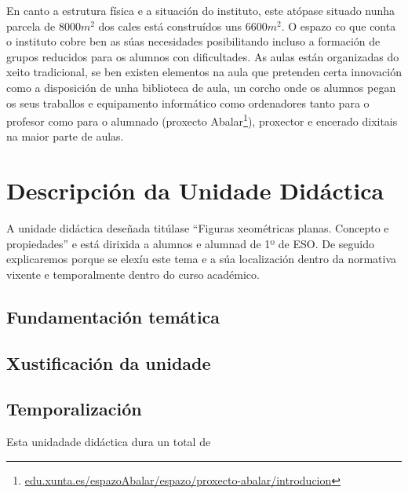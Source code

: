 En canto a estrutura física e a situación do instituto, este atópase situado nunha parcela de $8000 m^2$ dos cales está construídos uns $6600 m^2$. O espazo co que conta o instituto cobre ben as súas necesidades posibilitando incluso a formación de grupos reducidos para os alumnos con dificultades. As aulas están organizadas do xeito tradicional, se ben existen elementos na aula que pretenden certa innovación como a disposición de unha biblioteca de aula, un corcho onde os alumnos pegan os seus traballos e equipamento informático como ordenadores tanto para o profesor como para o alumnado (proxecto Abalar\footnote{\href{https://www.edu.xunta.es/espazoAbalar/espazo/proxecto-abalar/introducion}{edu.xunta.es/espazoAbalar/espazo/proxecto-abalar/introducion}}), proxector e encerado dixitais na maior parte de aulas.


\section{Descripción da Unidade Didáctica}
A unidade didáctica deseñada titúlase ``Figuras xeométricas planas. Concepto e propiedades'' e está dirixida a alumnos e alumnad de 1º de ESO. De seguido explicaremos porque se elexíu este tema e a súa localización dentro da normativa vixente e temporalmente dentro do curso académico.

\subsection{Fundamentación temática}

\subsection{Xustificación da unidade}

\subsection{Temporalización}
Esta unidadade didáctica dura un total de


